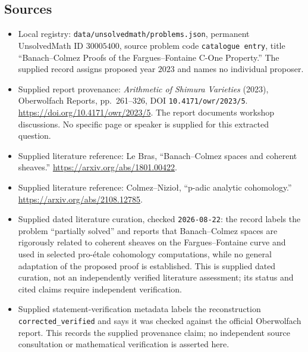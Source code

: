 \documentclass[11pt]{article}
\begin{document}
\subsection{Sources}
\begin{itemize}
\item Local registry: \texttt{data/unsolvedmath/problems.json}, permanent UnsolvedMath ID \(30005400\), source problem code \texttt{catalogue entry}, title ``Banach--Colmez Proofs of the Fargues--Fontaine C-One Property.'' The supplied record assigns proposed year \(2023\) and names no individual proposer.
\item Supplied report provenance: \emph{Arithmetic of Shimura Varieties} (2023), Oberwolfach Reports, pp.\ 261--326, DOI \texttt{10.4171/owr/2023/5}. \url{https://doi.org/10.4171/owr/2023/5}. The report documents workshop discussions. No specific page or speaker is supplied for this extracted question.
\item Supplied literature reference: Le Bras, ``Banach--Colmez spaces and coherent sheaves.'' \url{https://arxiv.org/abs/1801.00422}.
\item Supplied literature reference: Colmez--Nizio\l, ``p-adic analytic cohomology.'' \url{https://arxiv.org/abs/2108.12785}.
\item Supplied dated literature curation, checked \texttt{2026-08-22}: the record labels the problem ``partially solved'' and reports that Banach--Colmez spaces are rigorously related to coherent sheaves on the Fargues--Fontaine curve and used in selected pro-\'{e}tale cohomology computations, while no general adaptation of the proposed proof is established. This is supplied dated curation, not an independently verified literature assessment; its status and cited claims require independent verification.
\item Supplied statement-verification metadata labels the reconstruction \texttt{corrected\_verified} and says it was checked against the official Oberwolfach report. This records the supplied provenance claim; no independent source consultation or mathematical verification is asserted here.
\end{itemize}
\end{document}
